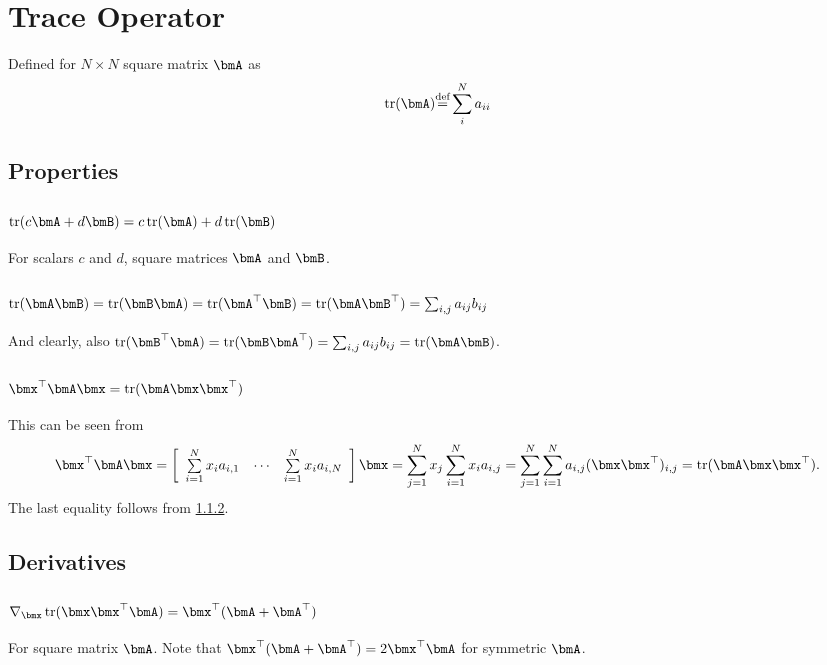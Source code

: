 \documentclass[11pt]{article}
\def\Def{{\stackrel{\text{def}}{=}}}
\DeclareMathOperator{\Trace}{tr}
\begin{document}
\section{Trace Operator}
Defined for $N \times N$ square matrix $\bmA$ as
\begin{equation}
\Trace(\bmA) \Def \sum_{i}^{N} a_{ii}
\label{eq:Definition-Trace}
\end{equation}

\subsection{Properties}

\subsubsection{$\Trace(c\bmA + d\bmB) = c\Trace(\bmA) + d\Trace(\bmB)$}
For scalars $c$ and $d$, square matrices $\bmA$ and $\bmB$.

\subsubsection{$\Trace(\bmA\bmB) = \Trace(\bmB\bmA) = \Trace(\bmA^\top\bmB) = \Trace(\bmA\bmB^\top) = \sum_{i,j} a_{ij}b_{ij}$}
\label{sec:trace-communitivity}
And clearly, also $\Trace(\bmB^\top\bmA) = \Trace(\bmB\bmA^\top) = \sum_{i,j} a_{ij}b_{ij} = \Trace(\bmA\bmB)$.

\subsubsection{$\bmx^\top \bmA \bmx = \Trace(\bmA \bmx \bmx^\top)$}
This can be seen from
\[\bmx^\top \bmA \bmx = \left[\begin{array}{ccc}
\sum\limits_{i=1}^N x_i a_{i, 1} & \cdots & \sum\limits_{i=1}^N x_i a_{i, N}
\end{array}\right] \bmx = \sum_{j=1}^{N} x_j \sum_{i=1}^N x_i a_{i, j} = \sum_{j=1}^{N} \sum_{i=1}^N a_{i, j} (\bmx \bmx^\top)_{i,j} = \Trace(\bmA \bmx \bmx^\top). \]
The last equality follows from \cref{sec:trace-communitivity}. %

\subsection{Derivatives}

\subsubsection{$\nabla_{\bmx}\Trace(\bmx \bmx^\top \bmA) = \bmx^\top (\bmA + \bmA^\top)$}
\label{sec:Trace-Derivative-tr(xx'A)}
For square matrix $\bmA$.
Note that $\bmx^\top (\bmA + \bmA^\top) = 2\bmx^\top \bmA$ for symmetric $\bmA$.
\end{document}

